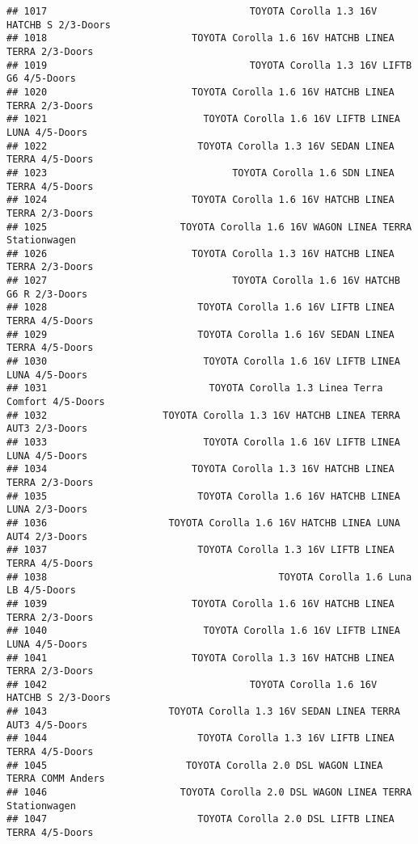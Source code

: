 \documentclass[]{article}
\begin{document}
\begin{verbatim}
## 1017                                   TOYOTA Corolla 1.3 16V HATCHB S 2/3-Doors
## 1018                         TOYOTA Corolla 1.6 16V HATCHB LINEA TERRA 2/3-Doors
## 1019                                   TOYOTA Corolla 1.3 16V LIFTB G6 4/5-Doors
## 1020                         TOYOTA Corolla 1.6 16V HATCHB LINEA TERRA 2/3-Doors
## 1021                           TOYOTA Corolla 1.6 16V LIFTB LINEA LUNA 4/5-Doors
## 1022                          TOYOTA Corolla 1.3 16V SEDAN LINEA TERRA 4/5-Doors
## 1023                                TOYOTA Corolla 1.6 SDN LINEA TERRA 4/5-Doors
## 1024                         TOYOTA Corolla 1.6 16V HATCHB LINEA TERRA 2/3-Doors
## 1025                       TOYOTA Corolla 1.6 16V WAGON LINEA TERRA Stationwagen
## 1026                         TOYOTA Corolla 1.3 16V HATCHB LINEA TERRA 2/3-Doors
## 1027                                TOYOTA Corolla 1.6 16V HATCHB G6 R 2/3-Doors
## 1028                          TOYOTA Corolla 1.6 16V LIFTB LINEA TERRA 4/5-Doors
## 1029                          TOYOTA Corolla 1.6 16V SEDAN LINEA TERRA 4/5-Doors
## 1030                           TOYOTA Corolla 1.6 16V LIFTB LINEA LUNA 4/5-Doors
## 1031                            TOYOTA Corolla 1.3 Linea Terra Comfort 4/5-Doors
## 1032                    TOYOTA Corolla 1.3 16V HATCHB LINEA TERRA AUT3 2/3-Doors
## 1033                           TOYOTA Corolla 1.6 16V LIFTB LINEA LUNA 4/5-Doors
## 1034                         TOYOTA Corolla 1.3 16V HATCHB LINEA TERRA 2/3-Doors
## 1035                          TOYOTA Corolla 1.6 16V HATCHB LINEA LUNA 2/3-Doors
## 1036                     TOYOTA Corolla 1.6 16V HATCHB LINEA LUNA AUT4 2/3-Doors
## 1037                          TOYOTA Corolla 1.3 16V LIFTB LINEA TERRA 4/5-Doors
## 1038                                        TOYOTA Corolla 1.6 Luna LB 4/5-Doors
## 1039                         TOYOTA Corolla 1.6 16V HATCHB LINEA TERRA 2/3-Doors
## 1040                           TOYOTA Corolla 1.6 16V LIFTB LINEA LUNA 4/5-Doors
## 1041                         TOYOTA Corolla 1.3 16V HATCHB LINEA TERRA 2/3-Doors
## 1042                                   TOYOTA Corolla 1.6 16V HATCHB S 2/3-Doors
## 1043                     TOYOTA Corolla 1.3 16V SEDAN LINEA TERRA AUT3 4/5-Doors
## 1044                          TOYOTA Corolla 1.3 16V LIFTB LINEA TERRA 4/5-Doors
## 1045                        TOYOTA Corolla 2.0 DSL WAGON LINEA TERRA COMM Anders
## 1046                       TOYOTA Corolla 2.0 DSL WAGON LINEA TERRA Stationwagen
## 1047                          TOYOTA Corolla 2.0 DSL LIFTB LINEA TERRA 4/5-Doors

\end{verbatim}
\end{document}
